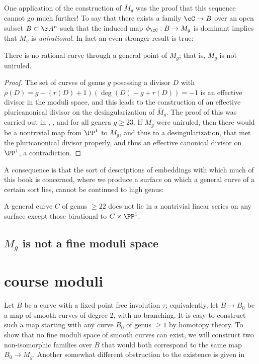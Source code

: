 One application of the construction of $\overline M_g$ was the proof that this sequence cannot go much further! To say that there exists a family $\cC \to B$ over an open subset $B \subset \AA^n$ such that the induced map $\phi_\cC : B \to M_g$ is dominant implies that $M_g$ is \emph{unirational}.  In fact an even stronger result is true:

\begin{theorem}
There is no rational curve through a general point of $M_g$; that is, $M_g$ is not uniruled.
\end{theorem}
\begin{proof}
The set of curves of genus $g$ posessing a divisor $D$ with $\rho(D) = g - (r(D)+1)(\deg(D) -g + r(D)) = -1$ is an effective divisor
in the moduli space, and this leads to the construction of an effective pluricanonical divisor on the desingularization of $\overline M_g$. The proof of this
was carried out in
\cite{Harris-Mumford-Moduli}, \cite{HarrisModuli}, and \cite{Eisenbud-HarrisModuli}
 for all genera $g \geq 23$.
If $M_g$ were uniruled, then there would be a nontrivial map from $\PP^1$ to $\overline M_g$, and thus to a desingularization, that met the pluricanonical divisor properly, and thus an effective canonical divisor on $\PP^1$, a contradiction. 
\end{proof}
 
 A consequence is that the sort of descriptions of embeddings with which much of this book is concerned, where we produce a surface on which a general curve of a certain sort lies, cannot be continued to high genus:

\begin{fact}
 A general curve $C$ of  genus $\geq 22$ does not lie in a nontrivial linear series on any surface
 except those birational to $C\times \PP^1$.
\end{fact}


\subsection{$M_g$ is not a fine moduli space}\section{course moduli}

Let $B$ be a curve with a fixed-point free involution $\tau$; equivalently, let $B \to B_0$ be a map of smooth curves of degree 2, with no branching. It is easy to construct such a map starting with any curve $B_0$ of genus $\geq 1$ by homotopy theory. 
To show that no fine moduli space of smooth curves can exist, we will construct two non-isomorphic families over $B$ that
would both correspond to the same map $B_0\to M_g$. Another somewhat different obstruction to the existence is given in 
\cite[Chapter 6]{DE-JH-schemes}

